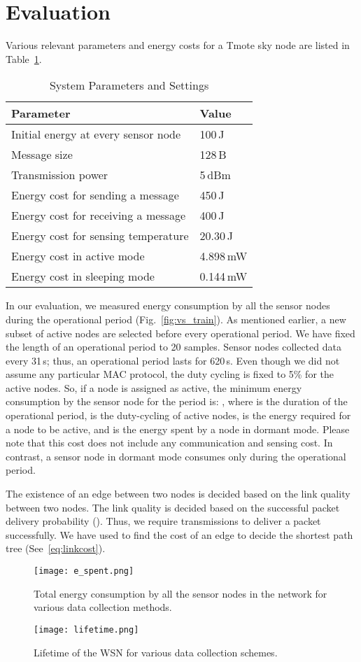 \documentclass[conference]{IEEEtran}
\begin{document}
\section{Evaluation}
\label{sec:eva}
Various relevant parameters and energy costs for a Tmote sky node are listed in Table~\ref{settings}.
\begin{table}
\centering
\caption{System Parameters and Settings}
\begin{tabular}{|l|l|} \hline
\textbf{Parameter} & \textbf{Value} \\ \hline
Initial energy at every sensor node & 100\,J \\ \hline
Message size & 128\,B \\ \hline
Transmission power & 5\,dBm \\ \hline
Energy cost for sending a message & 450\,J \\ \hline
Energy cost for receiving a message & 400\,J \\ \hline
Energy cost for sensing temperature & 20.30\,J \\ \hline
Energy cost in active mode & 4.898\,mW \\ \hline
Energy cost in sleeping mode & 0.144\,mW \\
\hline\end{tabular}
\label{settings}
\end{table}
In our evaluation, we measured energy consumption by all the sensor nodes during the operational period (Fig.~\ref{fig:vs_train}). As mentioned earlier, a new subset of active nodes are selected before every operational period. We have fixed the length of an operational period to 20 samples. Sensor nodes collected data every 31\,s; thus, an operational period lasts for 620\,s. Even though we did not assume any particular MAC protocol, the duty cycling is fixed to 5\% for the active nodes. So, if a node is assigned as active, the minimum energy consumption by the sensor node for the period is: ,
where  is the duration of the operational period,  is the duty-cycling of active nodes,  is the energy required for a node to be active, and  is the energy spent by a node in dormant mode. Please note that this cost does not include any communication and sensing cost. In contrast, a sensor node in dormant mode consumes only  during the operational period.

The existence of an edge between two nodes is decided based on the link quality between two nodes. The link quality is decided based on the successful packet delivery probability (). Thus, we require  transmissions to deliver a packet successfully. We have used  to find the cost of an edge to decide the shortest path tree (See~\ref{eq:linkcost}).
\begin{figure}[]
	\centering
	\texttt{[image: e\_spent.png]}
	\caption{Total energy consumption by all the sensor nodes in the network for various data collection methods.}
	\label{fig:e_spent}
\end{figure}
\begin{figure}[]
	\centering
	\texttt{[image: lifetime.png]}
	\caption{Lifetime of the WSN for various data collection schemes.}
	\label{fig:lifetime}
\end{figure}
\end{document}
